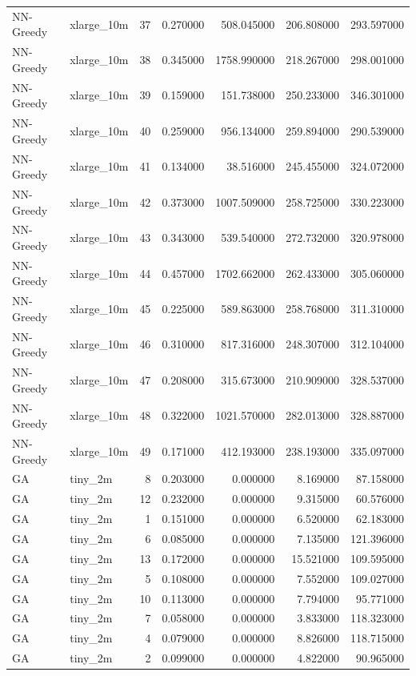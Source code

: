 \begin{tabular}{llrrrrr}
NN-Greedy & xlarge_10m & 37 & 0.270000 & 508.045000 & 206.808000 & 293.597000 \\
NN-Greedy & xlarge_10m & 38 & 0.345000 & 1758.990000 & 218.267000 & 298.001000 \\
NN-Greedy & xlarge_10m & 39 & 0.159000 & 151.738000 & 250.233000 & 346.301000 \\
NN-Greedy & xlarge_10m & 40 & 0.259000 & 956.134000 & 259.894000 & 290.539000 \\
NN-Greedy & xlarge_10m & 41 & 0.134000 & 38.516000 & 245.455000 & 324.072000 \\
NN-Greedy & xlarge_10m & 42 & 0.373000 & 1007.509000 & 258.725000 & 330.223000 \\
NN-Greedy & xlarge_10m & 43 & 0.343000 & 539.540000 & 272.732000 & 320.978000 \\
NN-Greedy & xlarge_10m & 44 & 0.457000 & 1702.662000 & 262.433000 & 305.060000 \\
NN-Greedy & xlarge_10m & 45 & 0.225000 & 589.863000 & 258.768000 & 311.310000 \\
NN-Greedy & xlarge_10m & 46 & 0.310000 & 817.316000 & 248.307000 & 312.104000 \\
NN-Greedy & xlarge_10m & 47 & 0.208000 & 315.673000 & 210.909000 & 328.537000 \\
NN-Greedy & xlarge_10m & 48 & 0.322000 & 1021.570000 & 282.013000 & 328.887000 \\
NN-Greedy & xlarge_10m & 49 & 0.171000 & 412.193000 & 238.193000 & 335.097000 \\
GA & tiny_2m & 8 & 0.203000 & 0.000000 & 8.169000 & 87.158000 \\
GA & tiny_2m & 12 & 0.232000 & 0.000000 & 9.315000 & 60.576000 \\
GA & tiny_2m & 1 & 0.151000 & 0.000000 & 6.520000 & 62.183000 \\
GA & tiny_2m & 6 & 0.085000 & 0.000000 & 7.135000 & 121.396000 \\
GA & tiny_2m & 13 & 0.172000 & 0.000000 & 15.521000 & 109.595000 \\
GA & tiny_2m & 5 & 0.108000 & 0.000000 & 7.552000 & 109.027000 \\
GA & tiny_2m & 10 & 0.113000 & 0.000000 & 7.794000 & 95.771000 \\
GA & tiny_2m & 7 & 0.058000 & 0.000000 & 3.833000 & 118.323000 \\
GA & tiny_2m & 4 & 0.079000 & 0.000000 & 8.826000 & 118.715000 \\
GA & tiny_2m & 2 & 0.099000 & 0.000000 & 4.822000 & 90.965000 \\

\end{tabular}
